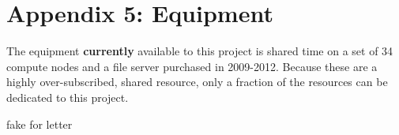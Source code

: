 \documentclass[12pt]{article}
\begin{document}
\section*{Appendix 5: Equipment}

The equipment {\bf currently} available to this project is shared time on a set
of 34 compute nodes and a file server purchased in 2009-2012.  
Because these are a highly over-subscribed, shared resource, only a fraction of
the resources can be dedicated to this project.

\newpage
{}
fake for letter
\end{document}
